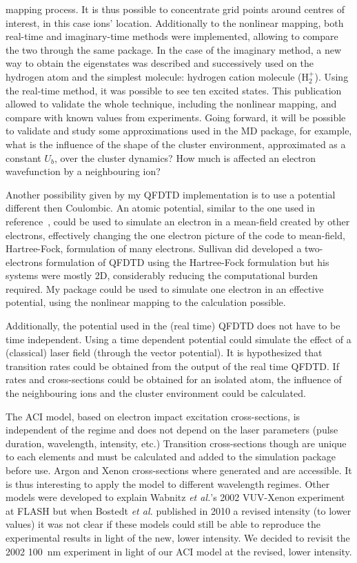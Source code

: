 mapping process. It is thus possible to concentrate grid points around centres
of interest, in this case ions' location. Additionally to the nonlinear mapping,
both real-time and imaginary-time methods were implemented, allowing to compare
the two through the same package. In the case of the imaginary method, a new
way to obtain the eigenstates was described and successively used on the
hydrogen atom and the simplest molecule: hydrogen cation molecule (H$_{2}^{+}$).
Using the real-time method, it was possible to see ten excited states. This
publication allowed to validate the whole technique, including the nonlinear
mapping, and compare with known values from experiments. Going forward, it will
be possible to validate and study some approximations used in the MD package,
for example, what is the influence of the shape of the cluster environment,
approximated as a constant $U_b$, over the cluster dynamics? How much is
affected an electron wavefunction by a neighbouring ion?

Another possibility given by my QFDTD implementation is to use a potential
different then Coulombic. An atomic potential, similar to the one used in
reference~\cite{Walters2006}, could be used to simulate an electron in a
mean-field created by other electrons, effectively changing the one electron
picture of the code to mean-field, Hartree-Fock, formulation of many electrons.
Sullivan did developed a two-electrons formulation of QFDTD using the
Hartree-Fock formulation but his systems were mostly 2D, considerably reducing
the computational burden required. My package could be used to simulate one
electron in an effective potential, using the nonlinear mapping to the
calculation possible.

Additionally, the potential used in the (real time) QFDTD does not have to be
time independent. Using a time dependent potential could simulate the effect of
a (classical) laser field (through the vector potential). It is hypothesized
that transition rates could be obtained from the output of the real time QFDTD.
If rates and cross-sections could be obtained for an isolated atom, the
influence of the neighbouring ions and the cluster environment could be
calculated.


The ACI model, based on electron impact excitation cross-sections, is independent of the
regime and does not depend on the laser parameters (pulse duration, wavelength,
intensity, etc.) Transition cross-sections though are unique to each elements
and must be calculated and added to the simulation package before use. Argon
and Xenon cross-sections where generated and are accessible. It is thus
interesting to apply the model to different wavelength regimes. Other models were developed
to explain Wabnitz \textit{et al.}'s 2002 VUV-Xenon experiment at FLASH but when
Bostedt \textit{et al.} published in 2010 a revised intensity (to lower values) it was
not clear if these models could still be able to reproduce the experimental results
in light of the new, lower intensity. We decided to revisit the 2002 100~nm
experiment in light of our ACI model at the revised, lower intensity.

